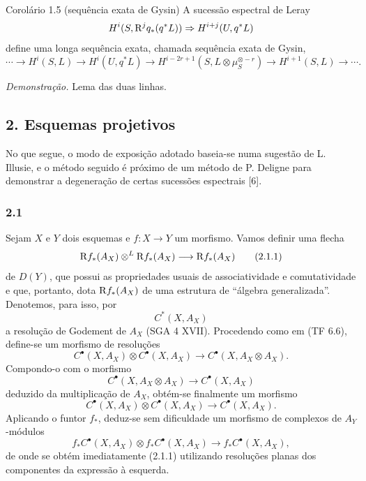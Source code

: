 \begin{statement}{Corolário 1.5 (sequência exata de Gysin)}
A sucessão espectral de Leray
\[
H^i(S,\mathrm{R}^j q_*(q^*L))\Rightarrow H^{i+j}(U,q^*L)
\]
define uma longa sequência exata, chamada sequência exata de Gysin,
\[
\cdots\longrightarrow H^i(S,L)\longrightarrow H^i(U,q^*L)\longrightarrow
H^{i-2r+1}(S,L\otimes\mu_S^{\otimes -r})\longrightarrow H^{i+1}(S,L)\longrightarrow\cdots.
\]
\end{statement}

\emph{Demonstração.} Lema das duas linhas.

\subsection*{2. Esquemas projetivos}

No que segue, o modo de exposição adotado baseia-se numa sugestão de L. Illusie, e o método seguido é próximo de um método de P. Deligne para demonstrar a degeneração de certas sucessões espectrais [6].

\subsubsection*{2.1}
Sejam $X$ e $Y$ dois esquemas e $f:X\to Y$ um morfismo. Vamos definir uma flecha
\[
\mathrm{R} f_*(A_X)\otimes^L \mathrm{R} f_*(A_X)\longrightarrow \mathrm{R} f_*(A_X)
\tag{2.1.1}
\]
de $D(Y)$, que possui as propriedades usuais de associatividade e comutatividade e que, portanto, dota $\mathrm{R} f_*(A_X)$ de uma estrutura de ``álgebra generalizada''. Denotemos, para isso, por
\[
C^*(X,A_X)
\]
a resolução de Godement de $A_X$ (SGA 4 XVII). Procedendo como em (TF 6.6), define-se um morfismo de resoluções
\[
C^{\bullet}(X,A_X)\otimes C^{\bullet}(X,A_X)\longrightarrow C^{\bullet}(X,A_X\otimes A_X).
\]
Compondo-o com o morfismo
\[
C^{\bullet}(X,A_X\otimes A_X)\longrightarrow C^{\bullet}(X,A_X)
\]
deduzido da multiplicação de $A_X$, obtém-se finalmente um morfismo
\[
C^{\bullet}(X,A_X)\otimes C^{\bullet}(X,A_X)\longrightarrow C^{\bullet}(X,A_X).
\tag{2.1.2}
\]
Aplicando o funtor $f_*$, deduz-se sem dificuldade um morfismo de complexos de $A_Y$-módulos
\[
f_*C^{\bullet}(X,A_X)\otimes f_*C^{\bullet}(X,A_X)\longrightarrow f_*C^{\bullet}(X,A_X),
\]
de onde se obtém imediatamente (2.1.1) utilizando resoluções planas dos componentes da expressão à esquerda.
